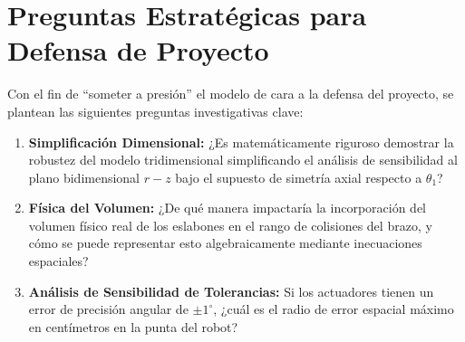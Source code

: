 \documentclass[11pt,a4paper]{article}
\begin{document}
\vspace{0.5cm}

\section{Preguntas Estratégicas para Defensa de Proyecto}
Con el fin de ``someter a presión'' el modelo de cara a la defensa del proyecto, se plantean las siguientes preguntas investigativas clave:
\begin{enumerate}
    \item \textbf{Simplificación Dimensional:} ¿Es matemáticamente riguroso demostrar la robustez del modelo tridimensional simplificando el análisis de sensibilidad al plano bidimensional $r-z$ bajo el supuesto de simetría axial respecto a $\theta_1$?
    \item \textbf{Física del Volumen:} ¿De qué manera impactaría la incorporación del volumen físico real de los eslabones en el rango de colisiones del brazo, y cómo se puede representar esto algebraicamente mediante inecuaciones espaciales?
    \item \textbf{Análisis de Sensibilidad de Tolerancias:} Si los actuadores tienen un error de precisión angular de $\pm 1^\circ$, ¿cuál es el radio de error espacial máximo en centímetros en la punta del robot?
\end{enumerate}
\end{document}
